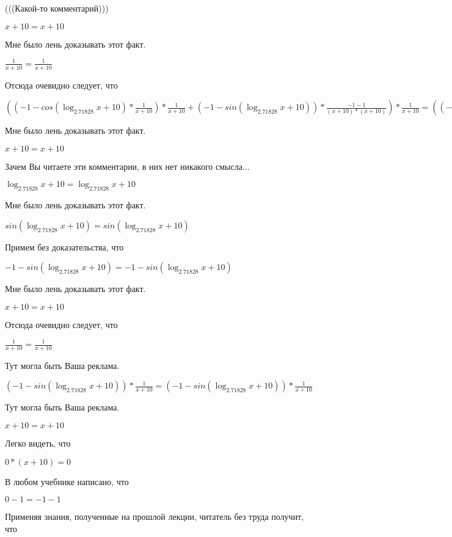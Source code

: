\documentclass[12pt,a4paper,fleqn]{article}
\theoremstyle{definition}
\begin{document}
(((Какой-то комментарий))) 

$ x  +  10  =  x  +  10 $

Мне было лень доказывать этот факт.

$\frac{ 1 }{ x  +  10 }
 = \frac{ 1 }{ x  +  10 }
$

Отсюда очевидно следует, что 

$(( -1  - cos(\log_{ 2.71828 }{ x  +  10 }) * \frac{ 1 }{ x  +  10 }
) * \frac{ 1 }{ x  +  10 }
 + ( -1  - sin(\log_{ 2.71828 }{ x  +  10 })) * \frac{ -1  -  1 }{( x  +  10 ) * ( x  +  10 )}
) * \frac{ 1 }{ x  +  10 }
 = (( -1  - cos(\log_{ 2.71828 }{ x  +  10 }) * \frac{ 1 }{ x  +  10 }
) * \frac{ 1 }{ x  +  10 }
 + ( -1  - sin(\log_{ 2.71828 }{ x  +  10 })) * \frac{ -1  -  1 }{( x  +  10 ) * ( x  +  10 )}
) * \frac{ 1 }{ x  +  10 }
$

Мне было лень доказывать этот факт.

$ x  +  10  =  x  +  10 $

Зачем Вы читаете эти комментарии, в них нет никакого смысла... 

$\log_{ 2.71828 }{ x  +  10 } = \log_{ 2.71828 }{ x  +  10 }$

Мне было лень доказывать этот факт.

$sin(\log_{ 2.71828 }{ x  +  10 }) = sin(\log_{ 2.71828 }{ x  +  10 })$

Примем без доказательства, что 

$ -1  - sin(\log_{ 2.71828 }{ x  +  10 }) =  -1  - sin(\log_{ 2.71828 }{ x  +  10 })$

Мне было лень доказывать этот факт.

$ x  +  10  =  x  +  10 $

Отсюда очевидно следует, что 

$\frac{ 1 }{ x  +  10 }
 = \frac{ 1 }{ x  +  10 }
$

Тут могла быть Ваша реклама. 

$( -1  - sin(\log_{ 2.71828 }{ x  +  10 })) * \frac{ 1 }{ x  +  10 }
 = ( -1  - sin(\log_{ 2.71828 }{ x  +  10 })) * \frac{ 1 }{ x  +  10 }
$

Тут могла быть Ваша реклама. 

$ x  +  10  =  x  +  10 $

Легко видеть, что 

$ 0  * ( x  +  10 ) =  0 $

В любом учебнике написано, что 

$ 0  -  1  =  -1  -  1 $

Применяя знания, полученные на прошлой лекции, читатель без труда получит, что 
\end{document}
